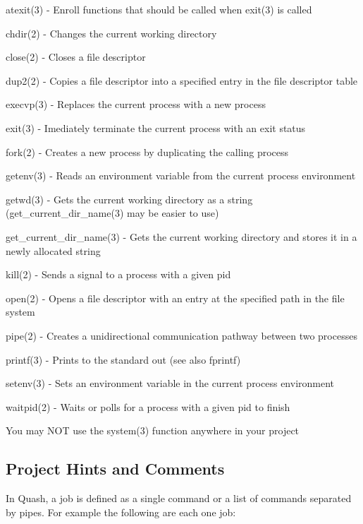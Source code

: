 \begin{DoxyItemize}
\item atexit(3) -\/ Enroll functions that should be called when exit(3) is called
\item chdir(2) -\/ Changes the current working directory
\item close(2) -\/ Closes a file descriptor
\item dup2(2) -\/ Copies a file descriptor into a specified entry in the file descriptor table
\item execvp(3) -\/ Replaces the current process with a new process
\item exit(3) -\/ Imediately terminate the current process with an exit status
\item fork(2) -\/ Creates a new process by duplicating the calling process
\item getenv(3) -\/ Reads an environment variable from the current process environment
\item getwd(3) -\/ Gets the current working directory as a string (get\-\_\-current\-\_\-dir\-\_\-name(3) may be easier to use)
\item get\-\_\-current\-\_\-dir\-\_\-name(3) -\/ Gets the current working directory and stores it in a newly allocated string
\item kill(2) -\/ Sends a signal to a process with a given pid
\item open(2) -\/ Opens a file descriptor with an entry at the specified path in the file system
\item pipe(2) -\/ Creates a unidirectional communication pathway between two processes
\item printf(3) -\/ Prints to the standard out (see also fprintf)
\item setenv(3) -\/ Sets an environment variable in the current process environment
\item waitpid(2) -\/ Waits or polls for a process with a given pid to finish
\end{DoxyItemize}

You may N\-O\-T use the system(3) function anywhere in your project

\subsection*{Project Hints and Comments}

In Quash, a job is defined as a single command or a list of commands separated by pipes. For example the following are each one job\-:

